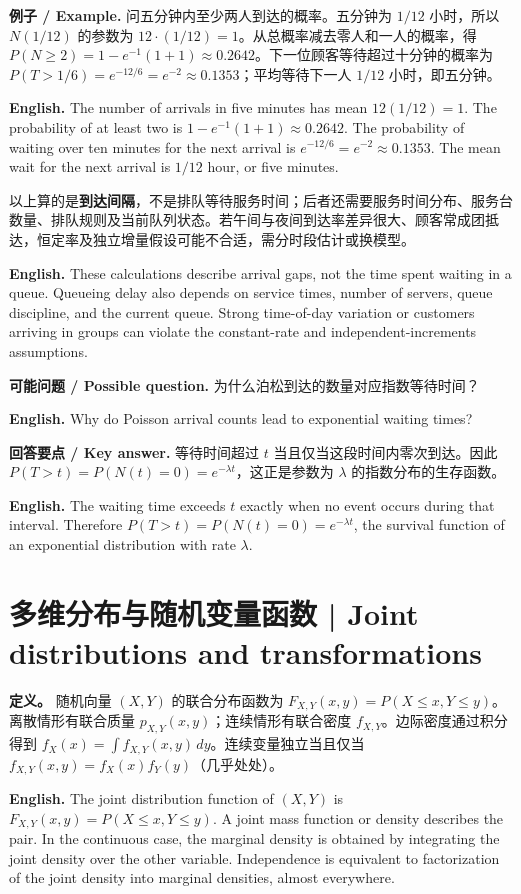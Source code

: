\documentclass[UTF8,11pt,a4paper]{ctexart}
\newcommand{\EN}[1]{\par\noindent\textbf{English.} #1\par}
\newcommand{\EX}[2]{\par\noindent\textbf{例子 / Example.} #1\par\EN{#2}}
\newcommand{\ASK}[4]{\par\noindent\textbf{可能问题 / Possible question.} #1\par\EN{#2}\noindent\textbf{回答要点 / Key answer.} #3\par\EN{#4}\medskip}
\begin{document}
\EX{问五分钟内至少两人到达的概率。五分钟为 $1/12$ 小时，所以 $N(1/12)$ 的参数为 $12\cdot(1/12)=1$。从总概率减去零人和一人的概率，得 $P(N\ge2)=1-e^{-1}(1+1)\approx0.2642$。下一位顾客等待超过十分钟的概率为 $P(T>1/6)=e^{-12/6}=e^{-2}\approx0.1353$；平均等待下一人 $1/12$ 小时，即五分钟。}{The number of arrivals in five minutes has mean $12(1/12)=1$. The probability of at least two is $1-e^{-1}(1+1)\approx0.2642$. The probability of waiting over ten minutes for the next arrival is $e^{-12/6}=e^{-2}\approx0.1353$. The mean wait for the next arrival is $1/12$ hour, or five minutes.}

\noindent 以上算的是\textbf{到达间隔}，不是排队等待服务时间；后者还需要服务时间分布、服务台数量、排队规则及当前队列状态。若午间与夜间到达率差异很大、顾客常成团抵达，恒定率及独立增量假设可能不合适，需分时段估计或换模型。
\EN{These calculations describe arrival gaps, not the time spent waiting in a queue. Queueing delay also depends on service times, number of servers, queue discipline, and the current queue. Strong time-of-day variation or customers arriving in groups can violate the constant-rate and independent-increments assumptions.}

\ASK{为什么泊松到达的数量对应指数等待时间？}{Why do Poisson arrival counts lead to exponential waiting times?}{等待时间超过 $t$ 当且仅当这段时间内零次到达。因此 $P(T>t)=P(N(t)=0)=e^{-\lambda t}$，这正是参数为 $\lambda$ 的指数分布的生存函数。}{The waiting time exceeds $t$ exactly when no event occurs during that interval. Therefore $P(T>t)=P(N(t)=0)=e^{-\lambda t}$, the survival function of an exponential distribution with rate $\lambda$.}

\section{多维分布与随机变量函数 | Joint distributions and transformations}
\noindent\textbf{定义。} 随机向量 $(X,Y)$ 的联合分布函数为 $F_{X,Y}(x,y)=P(X\le x,Y\le y)$。离散情形有联合质量 $p_{X,Y}(x,y)$；连续情形有联合密度 $f_{X,Y}$。边际密度通过积分得到 $f_X(x)=\int f_{X,Y}(x,y)\,dy$。连续变量独立当且仅当 $f_{X,Y}(x,y)=f_X(x)f_Y(y)$（几乎处处）。

\EN{The joint distribution function of $(X,Y)$ is $F_{X,Y}(x,y)=P(X\le x,Y\le y)$. A joint mass function or density describes the pair. In the continuous case, the marginal density is obtained by integrating the joint density over the other variable. Independence is equivalent to factorization of the joint density into marginal densities, almost everywhere.}
\end{document}

